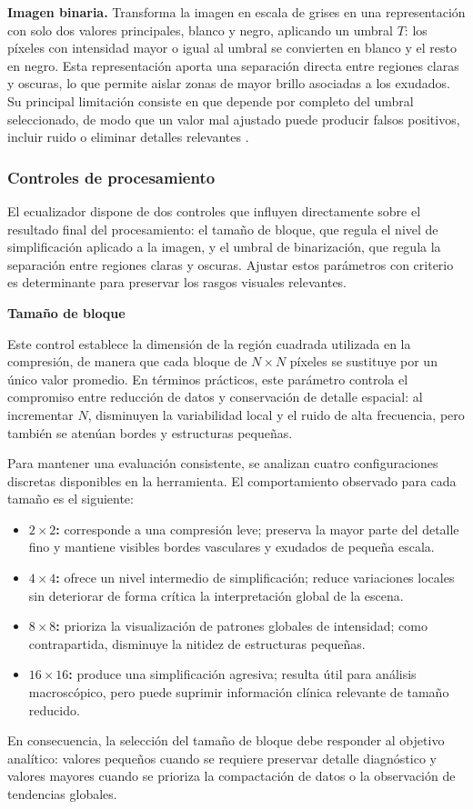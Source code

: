 \documentclass[11pt]{article}
\begin{document}
\textbf{Imagen binaria.} Transforma la imagen en escala de grises en una representación con solo dos valores principales, blanco y negro, aplicando un umbral $T$: los píxeles con intensidad mayor o igual al umbral se convierten en blanco y el resto en negro. Esta representación aporta una separación directa entre regiones claras y oscuras, lo que permite aislar zonas de mayor brillo asociadas a los exudados. Su principal limitación consiste en que depende por completo del umbral seleccionado, de modo que un valor mal ajustado puede producir falsos positivos, incluir ruido o eliminar detalles relevantes \cite{b4}.

\subsubsection{Controles de procesamiento}

El ecualizador dispone de dos controles que influyen directamente sobre el resultado final del procesamiento: el tamaño de bloque, que regula el nivel de simplificación aplicado a la imagen, y el umbral de binarización, que regula la separación entre regiones claras y oscuras. Ajustar estos parámetros con criterio es determinante para preservar los rasgos visuales relevantes.

\medskip
\noindent\textbf{Tamaño de bloque}

Este control establece la dimensión de la región cuadrada utilizada en la compresión, de manera que cada bloque de $N \times N$ píxeles se sustituye por un único valor promedio. En términos prácticos, este parámetro controla el compromiso entre reducción de datos y conservación de detalle espacial: al incrementar $N$, disminuyen la variabilidad local y el ruido de alta frecuencia, pero también se atenúan bordes y estructuras pequeñas.

Para mantener una evaluación consistente, se analizan cuatro configuraciones discretas disponibles en la herramienta. El comportamiento observado para cada tamaño es el siguiente:
\begin{itemize}
    \item \textbf{$2 \times 2$:} corresponde a una compresión leve; preserva la mayor parte del detalle fino y mantiene visibles bordes vasculares y exudados de pequeña escala.
    \item \textbf{$4 \times 4$:} ofrece un nivel intermedio de simplificación; reduce variaciones locales sin deteriorar de forma crítica la interpretación global de la escena.
    \item \textbf{$8 \times 8$:} prioriza la visualización de patrones globales de intensidad; como contrapartida, disminuye la nitidez de estructuras pequeñas.
    \item \textbf{$16 \times 16$:} produce una simplificación agresiva; resulta útil para análisis macroscópico, pero puede suprimir información clínica relevante de tamaño reducido.
\end{itemize}
En consecuencia, la selección del tamaño de bloque debe responder al objetivo analítico: valores pequeños cuando se requiere preservar detalle diagnóstico y valores mayores cuando se prioriza la compactación de datos o la observación de tendencias globales.
\end{document}
